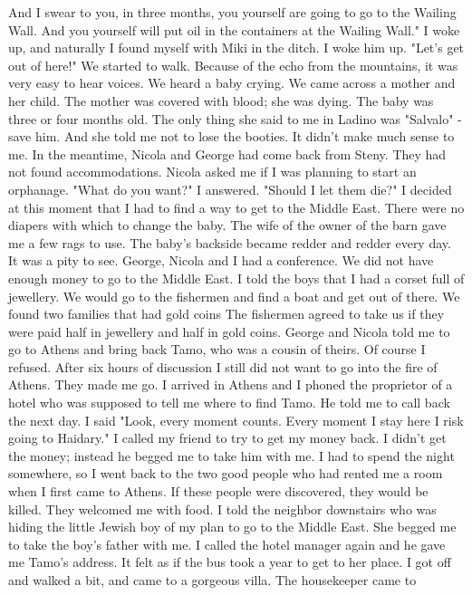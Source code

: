 And I swear to you, in three months, you yourself are going to go to 
the Wailing Wall.
And you yourself will put oil in the containers at the Wailing Wall."
I woke up, and naturally I found myself with Miki in the 
ditch.
I woke him up.
"Let's get out of here!"
We started to walk.
Because of the echo from the mountains, it was very easy to hear voices.
We heard a baby crying.
We came across a 
mother and her child.
The mother was covered with blood; she was dying.
The baby was three or four months old.
The only thing she said to me in 
Ladino was "Salvalo" - save him.
And she told me not to lose the booties.
It didn't make much sense to me.
In the meantime, Nicola and George had come back from Steny.
They 
had not found accommodations.
Nicola asked me if I was planning to start 
an orphanage.
"What do you want?"
I answered.
"Should I let them die?"
I decided at this moment that I had to find a way to get to the Middle East.
There were no diapers with which to change the baby.
The wife of 
the owner of the barn gave me a few rags to use.
The baby's 
backside became redder and redder every day.
It was a pity to see.
George, Nicola and I had a conference.
We did not have enough money to go to the Middle East.
I told the boys that I had a corset full of jewellery.
We would go to the fishermen and find a boat and get out of there.
We found two families that had gold coins The fishermen agreed to take us  if they were paid half in jewellery and half in gold coins.
George and Nicola told me to go to Athens and bring back Tamo, who 
was a cousin of theirs.
Of course I refused.
After six hours of discussion I still did not want to go into the fire of Athens.
They made me go.
I arrived in Athens and I phoned the proprietor of a hotel who was 
supposed to tell me where to find Tamo.
He told me to call back the 
next day.
I said "Look, every moment counts.
Every moment I stay here 
I risk going to Haidary."
I called my friend to try to get my money back.
I didn't get the money; instead he begged me to take him with me.
I had to spend the night somewhere, so I went back to the two good 
people who had rented me a room when I first came to Athens.
If these 
people were discovered, they would be killed.
They welcomed me with 
food.
I told the neighbor downstairs who was hiding the little Jewish 
boy of my plan to go to the Middle East.
She begged me to take the 
boy's father with me.
I called the hotel manager again and he gave me Tamo's address.
It felt as if the bus took a year to get to her place.
I got off and 
walked a bit, and came to a gorgeous villa.
The housekeeper came to 

